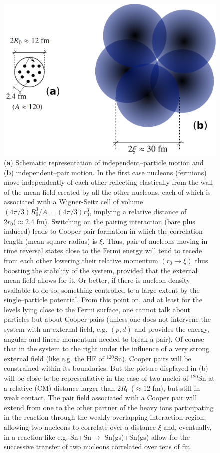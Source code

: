 \begin{figure}
\centerline{\includegraphics*[width=14cm,angle=0]{nutshell/figs/fig3_1_4.pdf}}
\caption{(\textbf{a}) Schematic representation of independent--particle motion and (\textbf{b}) independent--pair motion. In the first case nucleons (fermions) move independently of each other reflecting elastically from the wall of the mean field created by all the other nucleons, each of which is associated with a Wigner-Seitz cell of volume $(4\pi/3)R_0^3/A=(4\pi/3)r_0^3$, implying a relative distance of $2r_0(\approx 2.4$ fm). Switching on the pairing interaction (bare plus induced) leads to Cooper pair formation in which the correlation length (mean square radius) is $\xi$. Thus, pair of nucleons moving in time reversal states close to the Fermi energy will tend to recede from each other lowering their relative momentum $(r_0\rightarrow \xi)$ thus boosting the stability of the system, provided that the external mean field allows for it. Or better, if  there is nucleon density available to do so, something controlled to a large extent by the single--particle potential. From this point on, and at least for the levels lying close to the Fermi surface, one cannot talk about particles but about Cooper pairs (unless one does not intervene the system with an external field, e.g. $(p,d)$ and provides the energy, angular and linear momentum needed to break a pair). Of course that in the system to the right under the influence of a very strong external field (like e.g. the HF of $^{120}$Sn), Cooper pairs will be constrained within its boundaries. But the picture displayed in (b) will be close to be representative  in the case of two nuclei of $^{120}$Sn at a relative (CM) distance larger than $2R_0$ ($\approx 12$ fm), but still in weak contact. The pair field associated with a Cooper pair will extend from one to the other partner of the heavy ions participating in the reaction through the weakly overlapping interaction region, allowing two nucleons to correlate over a distance $\xi$ and, eventually, in a reaction like e.g. Sn+Sn$\rightarrow$ Sn(gs)+Sn(gs) allow for the successive transfer of two nucleons correlated over tens of fm.}\label{fig3.2.1}
\end{figure}
